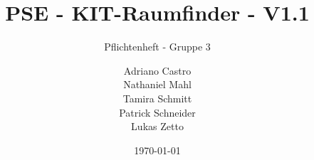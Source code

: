 \title{
    PSE - KIT-Raumfinder - V1.1
}
\subtitle{Pflichtenheft - Gruppe 3}
\author{
    Adriano Castro \\
    Nathaniel Mahl \\
    Tamira Schmitt \\
    Patrick Schneider \\
    Lukas Zetto
}

\date{\today}

\maketitle